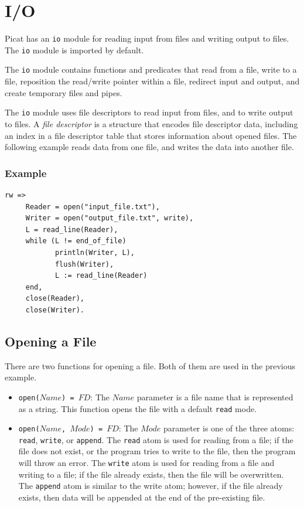 \chapter{\label{chapter:io}I/O}
Picat has an \texttt{io} module for reading input from files and writing output to files.  The \texttt{io} module is imported by default.

The \texttt{io} module contains functions and predicates that read from a file, write to a file, reposition the read/write pointer within a file, redirect input and output, and create temporary files and pipes.

The \texttt{io} module uses file descriptors to read input from files, and to write output to files.  A \emph{file descriptor} is a structure that encodes file descriptor data, including an index in a file descriptor table that stores information about opened files.  The following example reads data from one file, and writes the data into another file.

\subsection*{Example}
\begin{verbatim}
rw =>
     Reader = open("input_file.txt"),
     Writer = open("output_file.txt", write),
     L = read_line(Reader),
     while (L != end_of_file)
            println(Writer, L),
            flush(Writer),
            L := read_line(Reader)
     end,
     close(Reader),
     close(Writer).
\end{verbatim}

\section{Opening a File}
There are two functions for opening a file.  Both of them are used in the previous example.
\begin{itemize}
\item \texttt{open($Name$) = $FD$}: The $Name$ parameter is a file name that is represented as a string.  This function opens the file with a default \texttt{read} mode.
\item \texttt{open($Name$, $Mode$) = $FD$}: The $Mode$ parameter is one of the three atoms: \texttt{read}, \texttt{write}, or \texttt{append}.  The \texttt{read} atom is used for reading from a file; if the file does not exist, or the program tries to write to the file, then the program will throw an error.  The \texttt{write} atom is used for reading from a file and writing to a file; if the file already exists, then the file will be overwritten.  The \texttt{append} atom is similar to the write atom; however, if the file already exists, then data will be appended at the end of the pre-existing file.  
\end{itemize}

